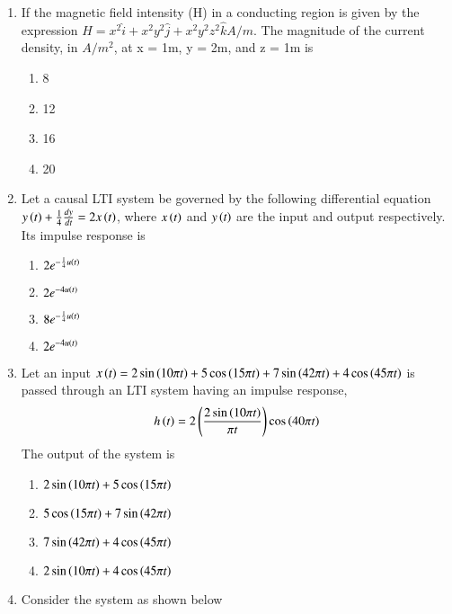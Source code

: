 \documentclass[journal,12pt,onecolumn]{IEEEtran}
\theoremstyle{remark}
\begin{document}
\begin{enumerate}
\item If the magnetic field intensity (H) in a conducting region is given by the expression $H = x^2 \hat{i}+ x^2y^2\hat{j}+ x^2y^2z^2\hat{k} A/m$. The magnitude of the current density, in $A/m^2$, at x = 1m, y = 2m, and z = 1m is
\begin{enumerate}
    \item 8
    \item 12
    \item 16
    \item 20
\end{enumerate}

\item Let a causal LTI system be governed by the following differential equation $y\left(t\right) + \frac{1}{4}\frac{dy}{dt} = 2x\left(t\right)$, where $x\left(t\right)$ and $y\left(t\right)$ are the input and output respectively. Its impulse response is 
\begin{enumerate}
    \item $2e^{-\frac{1}{4}u\left(t\right)}$
    \item $2e^{-4u\left(t\right)}$
    \item $8e^{-\frac{1}{4}u\left(t\right)}$
    \item $2e^{-4u\left(t\right)}$
\end{enumerate}

\item Let an input $x\left(t\right) = 2\sin\left(10\pi t\right) + 5\cos\left(15\pi t\right) + 7\sin\left(42\pi t\right) + 4\cos\left(45\pi t\right)$ is passed through an LTI system having an impulse response,
\begin{align*}
    h\left(t\right) = 2\left(\frac{2\sin\left(10\pi t\right)}{\pi t}\right)\cos\left(40\pi t\right)
\end{align*}
The output of the system is
\begin{enumerate}
    \item $2\sin\left(10\pi t\right) + 5\cos\left(15\pi t\right)$
    \item $5\cos\left(15\pi t\right) + 7\sin\left(42\pi t\right)$
    \item $7\sin\left(42\pi t\right) + 4\cos\left(45\pi t\right)$
    \item $2\sin\left(10\pi t\right) + 4\cos\left(45\pi t\right)$
\end{enumerate}

\item Consider the system as shown below
\begin{figure}[!ht]
\centering
{}%


\end{figure}
\end{enumerate}
\end{document}

